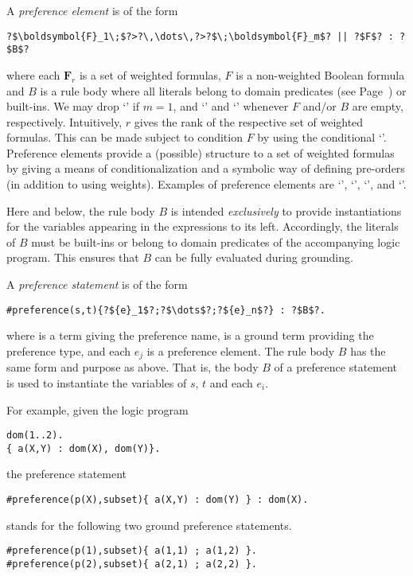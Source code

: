 A \emph{preference element} is of the form
\begin{lstlisting}[numbers=none,escapechar=?]
?$\boldsymbol{F}_1\;$?>?\,\dots\,?>?$\;\boldsymbol{F}_m$? || ?$F$? : ?$B$?
\end{lstlisting}
where each $\boldsymbol{F}_r$ is a set of weighted formulas, 
$F$ is a non-weighted Boolean formula
and $B$ is a rule body where all literals belong to domain predicates
(see Page~\pageref{pg:domain}) or built-ins.
%
We may drop `\code{>}' if $m=1$, 
and `' and `' whenever $F$ and/or $B$ are empty, respectively.
%
Intuitively, $r$ gives the rank of the respective set of weighted formulas.
This can be made subject to condition $F$ by using the conditional `\code{||}'.
Preference elements provide a (possible) structure to a set of weighted formulas
by giving a means of conditionalization and a symbolic way of defining pre-orders (in addition to using weights).
%
%
Examples of preference elements are 
`',  
`', 
`',  and
`'.

\begin{note}
Here and below, 
the rule body $B$ is intended \emph{exclusively} to provide instantiations for the variables appearing in the expressions to its left.  
Accordingly, the literals of $B$ must be built-ins or belong to domain predicates of the accompanying logic program.
This ensures that $B$ can be fully evaluated during grounding.
\end{note}

A \emph{preference statement} is of the form
%
\begin{lstlisting}[numbers=none,escapechar=?]
#preference(s,t){?${e}_1$?;?$\dots$?;?${e}_n$?} : ?$B$?.
\end{lstlisting}
%
where  is a term giving the preference name, 
 is a ground term providing the preference type, 
and each $e_j$ is a preference element.
The rule body $B$ has the same form and purpose as above.
%
That is, the body $B$ of a preference statement is used to instantiate the variables of $s$, $t$ and each $e_i$.

For example, given the logic program 
\begin{lstlisting}[numbers=none]
dom(1..2).
{ a(X,Y) : dom(X), dom(Y)}.
\end{lstlisting}
the preference statement 
\begin{lstlisting}[numbers=none]
#preference(p(X),subset){ a(X,Y) : dom(Y) } : dom(X).
\end{lstlisting}
stands for the following two ground preference statements.
\begin{lstlisting}[numbers=none]
#preference(p(1),subset){ a(1,1) ; a(1,2) }.
#preference(p(2),subset){ a(2,1) ; a(2,2) }.
\end{lstlisting}

